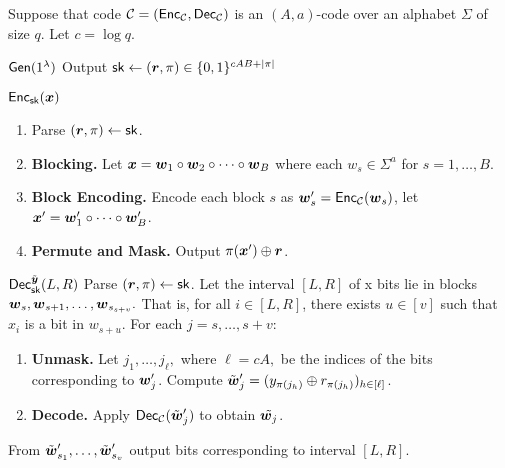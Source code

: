 \begin{construction}\label{constr:paLDCV1} 
Suppose that code $\mathcal{C} = (\mathsf{Enc}_{\mathcal{C}},\mathsf{Dec}_{\mathcal{C}})$ is an $(A,a)$-code over an alphabet $\Sigma$ of size $q$. 
Let $c = \log q$.
\begin{weirdFrame}{$\mathsf{Gen}(1^\lambda) $}
    Output $\mathsf{sk} \leftarrow (\boldsymbol{r},\pi) \in \{0,1\}^{cAB + |\pi| }$    

\end{weirdFrame}

\begin{weirdFrame}{$\mathsf{Enc}_{\mathsf{sk}}({\boldsymbol{x}})$}
\begin{enumerate}
    \item Parse $(\boldsymbol{r},\pi) \leftarrow \mathsf{sk}$.
    \item \textbf{Blocking.} Let ${\boldsymbol{x}} = \boldsymbol{w}_1 \circ \boldsymbol{w}_2 \circ \dots \circ \boldsymbol{w}_{B}$ where each $w_s \in \Sigma^a$ for $s = 1,\dots, B$. 
    \item \textbf{Block Encoding.} Encode each block $s$ as $\boldsymbol{w}_s' = \mathsf{Enc}_{\mathcal{C}} (\boldsymbol{w}_s)$, let ${\boldsymbol{x}}' = \boldsymbol{w}_1'\circ\dots\circ \boldsymbol{w}_B'$.
    \item \textbf{Permute and Mask.} Output $\pi({\boldsymbol{x}}') \oplus \boldsymbol{r}$.
\end{enumerate}
\end{weirdFrame}

\begin{weirdFrame}{$\mathsf{Dec}_{\mathsf{sk}}^{\Tilde{\boldsymbol{y}}}(L,R)$}
Parse $(\boldsymbol{r},\pi) \leftarrow \mathsf{sk}$.
Let the interval $[L,R]$ of x bits lie in blocks $\boldsymbol{w}_{s},\boldsymbol{w}_{s+1},\dots,\boldsymbol{w}_{s_{s + v}}.$ 
That is, for all $i \in [L,R]$, there exists $u \in [v]$ such that $x_i$ is a bit in $w_{s + u}$.
For each $j = s,\dots,s + v:$
\begin{enumerate}
    \item \textbf{Unmask.} Let $j_1,\dots,j_\ell,$ where $\ell = cA,$ be the indices of the bits corresponding to $\boldsymbol{w}'_j$. 
    Compute $\Tilde{\boldsymbol{w}}'_j = (y_{\pi(j_h)} \oplus r_{\pi(j_h)})_{h \in [\ell]}$.
    \item \textbf{Decode.} Apply $\mathsf{Dec}_{\mathcal{C}}(\Tilde{\boldsymbol{w}}'_j)$ to obtain $\Tilde{\boldsymbol{w}_j}$. 
\end{enumerate}
From $\Tilde{\boldsymbol{w}}'_{s_1},\dots,\Tilde{\boldsymbol{w}}'_{s_v}$ output bits corresponding to interval $[L,R]$. 
\end{weirdFrame}
\end{construction}